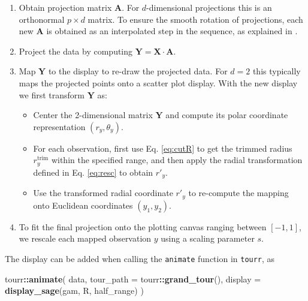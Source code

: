 \documentclass[]{interact}
\theoremstyle{plain}%
\theoremstyle{definition}
\theoremstyle{remark}
\newenvironment{Shaded}{\begin{snugshade}}{\end{snugshade}}
\newcommand{\DataTypeTok}[1]{\textcolor[rgb]{0.13,0.29,0.53}{#1}}
\newcommand{\KeywordTok}[1]{\textcolor[rgb]{0.13,0.29,0.53}{\textbf{#1}}}
\newcommand{\NormalTok}[1]{#1}
\newcommand{\OperatorTok}[1]{\textcolor[rgb]{0.81,0.36,0.00}{\textbf{#1}}}
\def\tightlist{}
\begin{document}
\begin{enumerate}
\def\labelenumi{\arabic{enumi}.}
\tightlist
\item
  Obtain projection matrix \(\mathbf{A}\). For \(d\)-dimensional
  projections this is an orthonormal \(p \times d\) matrix. To ensure
  the smooth rotation of projections, each new \(\mathbf{A}\) is
  obtained as an interpolated step in the sequence, as explained in
  \citet{BCAH05}.
\item
  Project the data by computing
  \(\mathbf{Y} = \mathbf{X}\cdot\mathbf{A}\).
\item
  Map \(\mathbf{Y}\) to the display to re-draw the projected data. For
  \(d=2\) this typically maps the projected points onto a scatter plot
  display. With the new display we first transform \(\mathbf{Y}\) as:

  \begin{itemize}
  \tightlist
  \item
    Center the 2-dimensional matrix \(\mathbf{Y}\) and compute its polar
    coordinate representation \((r_y, \theta_y)\).
  \item
    For each observation, first use Eq. \ref{eq:cutR} to get the trimmed
    radius \(r_y^{\mathrm{trim}}\) within the specified range, and then
    apply the radial transformation defined in Eq. \ref{eq:resc} to
    obtain \(r'_y\).
  \item
    Use the transformed radial coordinate \(r'_y\) to re-compute the
    mapping onto Euclidean coordinates \((y_1, y_2)\).
  \end{itemize}
\item
  To fit the final projection onto the plotting canvas ranging between
  \([-1,1]\), we rescale each mapped observation \(y\) using a scaling
  parameter \(s\).
\end{enumerate}

The display can be added when calling the \texttt{animate} function in
\texttt{tourr}, as

\begin{Shaded}
\begin{Highlighting}[]
\NormalTok{tourr}\OperatorTok{::}\KeywordTok{animate}\NormalTok{(}
\NormalTok{  data,}
  \DataTypeTok{tour_path =}\NormalTok{ tourr}\OperatorTok{::}\KeywordTok{grand_tour}\NormalTok{(),}
  \DataTypeTok{display =} \KeywordTok{display_sage}\NormalTok{(gam, R, half_range)}
\NormalTok{  )}
\end{Highlighting}
\end{Shaded}
\end{document}
